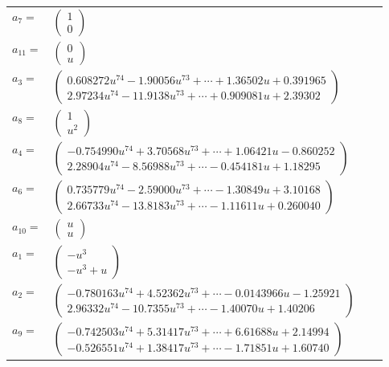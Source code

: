 \documentclass[1p]{elsarticle_modified}
\theoremstyle{definition}
\begin{document}
\begin{tabular}{m{7pt} m{180pt} m{7pt} m{180pt} }
\flushright $a_{7}=$&$\begin{pmatrix}1\\0\end{pmatrix}$ \\
\flushright $a_{11}=$&$\begin{pmatrix}0\\u\end{pmatrix}$ \\
\flushright $a_{3}=$&$\begin{pmatrix}0.608272 u^{74}-1.90056 u^{73}+\cdots+1.36502 u+0.391965\\2.97234 u^{74}-11.9138 u^{73}+\cdots+0.909081 u+2.39302\end{pmatrix}$ \\
\flushright $a_{8}=$&$\begin{pmatrix}1\\u^2\end{pmatrix}$ \\
\flushright $a_{4}=$&$\begin{pmatrix}-0.754990 u^{74}+3.70568 u^{73}+\cdots+1.06421 u-0.860252\\2.28904 u^{74}-8.56988 u^{73}+\cdots-0.454181 u+1.18295\end{pmatrix}$ \\
\flushright $a_{6}=$&$\begin{pmatrix}0.735779 u^{74}-2.59000 u^{73}+\cdots-1.30849 u+3.10168\\2.66733 u^{74}-13.8183 u^{73}+\cdots-1.11611 u+0.260040\end{pmatrix}$ \\
\flushright $a_{10}=$&$\begin{pmatrix}u\\u\end{pmatrix}$ \\
\flushright $a_{1}=$&$\begin{pmatrix}- u^3\\- u^3+u\end{pmatrix}$ \\
\flushright $a_{2}=$&$\begin{pmatrix}-0.780163 u^{74}+4.52362 u^{73}+\cdots-0.0143966 u-1.25921\\2.96332 u^{74}-10.7355 u^{73}+\cdots-1.40070 u+1.40206\end{pmatrix}$ \\
\flushright $a_{9}=$&$\begin{pmatrix}-0.742503 u^{74}+5.31417 u^{73}+\cdots+6.61688 u+2.14994\\-0.526551 u^{74}+1.38417 u^{73}+\cdots-1.71851 u+1.60740\end{pmatrix}$ \\

\end{tabular}
\end{document}
